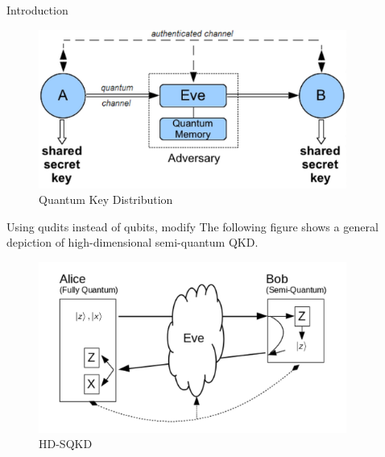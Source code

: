 \documentclass[final]{beamer}
\newlength{\sepwid}
\newlength{\onecolwid}
\newlength{\twocolwid}
\begin{document}
\begin{frame}[t]
\begin{columns}[t]
\begin{column}{\onecolwid}
\begin{block}{Introduction}
\begin{figure}
	\includegraphics[width=0.8\linewidth]{qkd.png}
	\caption{Quantum Key Distribution}
\end{figure}

\end{block}


Using qudits instead of qubits, modify The following figure shows a general depiction of high-dimensional semi-quantum QKD. 

\begin{figure}
\includegraphics[width=0.8\linewidth]{sqkd_hidim}
\caption{HD-SQKD}
\label{fig:sqkd_hidim}
\end{figure}


\end{column} %

\begin{column}{\sepwid}\end{column} %

\begin{column}{\twocolwid} %

\begin{columns}[t,totalwidth=\twocolwid] %


\end{columns}
\end{column}
\end{columns}
\end{frame}
\end{document}
